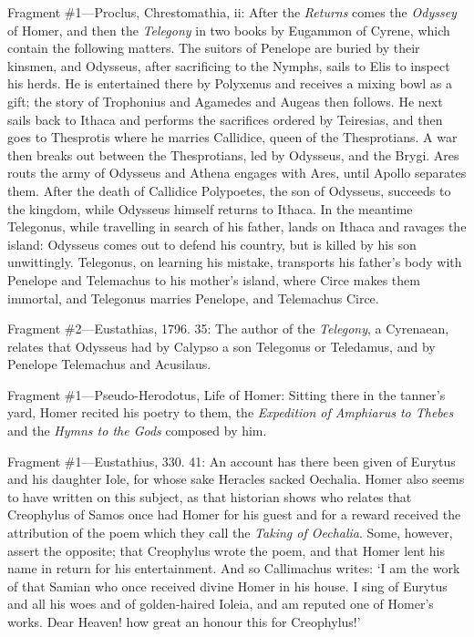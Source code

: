 Fragment \#1—Proclus, Chrestomathia, ii: After the \emph{Returns}
comes the \emph{Odyssey} of Homer, and then the \emph{Telegony}
in two books by Eugammon of Cyrene, which contain the following matters. The
suitors of Penelope are buried by their kinsmen, and Odysseus, after
sacrificing to the Nymphs, sails to Elis to inspect his herds. He is
entertained there by Polyxenus and receives a mixing bowl as a gift; the story
of Trophonius and Agamedes and Augeas then follows. He next sails back to
Ithaca and performs the sacrifices ordered by Teiresias, and then goes to
Thesprotis where he marries Callidice, queen of the Thesprotians. A war then
breaks out between the Thesprotians, led by Odysseus, and the Brygi. Ares routs
the army of Odysseus and Athena engages with Ares, until Apollo separates them.
After the death of Callidice Polypoetes, the son of Odysseus, succeeds to the
kingdom, while Odysseus himself returns to Ithaca. In the meantime Telegonus,
while travelling in search of his father, lands on Ithaca and ravages the
island: Odysseus comes out to defend his country, but is killed by his son
unwittingly. Telegonus, on learning his mistake, transports his father’s
body with Penelope and Telemachus to his mother’s island, where Circe
makes them immortal, and Telegonus marries Penelope, and Telemachus Circe.

Fragment \#2—Eustathias, 1796. 35: The author of the
\emph{Telegony}, a Cyrenaean, relates that Odysseus had by Calypso a son
Telegonus or Teledamus, and by Penelope Telemachus and Acusilaus.



Fragment \#1—Pseudo-Herodotus, Life of Homer: Sitting there in the
tanner’s yard, Homer recited his poetry to them, the \emph{Expedition of
Amphiarus to Thebes} and the \emph{Hymns to the Gods} composed by
him.


Fragment \#1—Eustathius, 330. 41: An account has there been given of
Eurytus and his daughter Iole, for whose sake Heracles sacked Oechalia. Homer
also seems to have written on this subject, as that historian shows who relates
that Creophylus of Samos once had Homer for his guest and for a reward received
the attribution of the poem which they call the \emph{Taking of
Oechalia}. Some, however, assert the opposite; that Creophylus wrote the
poem, and that Homer lent his name in return for his entertainment. And so
Callimachus writes: ‘I am the work of that Samian who once received
divine Homer in his house. I sing of Eurytus and all his woes and of
golden-haired Ioleia, and am reputed one of Homer’s works. Dear Heaven!
how great an honour this for Creophylus!’

